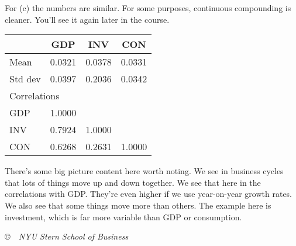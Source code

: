 \documentclass[12pt]{exam}
\begin{document}
\begin{questions}
\begin{solution}
For (c) the numbers are similar.
For some purposes, continuous compounding is cleaner.
You'll see it again later in the course.
%
\begin{center}
\begin{tabular}{lccc}
\toprule
            &   GDP   &  INV  &   CON  \\
\midrule
Mean        &  0.0321 &  0.0378 & 0.0331 \\
Std dev     &  0.0397 &  0.2036 & 0.0342 \\
\midrule
\multicolumn{2}{l}{Correlations} \\
GDP         &  1.0000 \\
INV         &  0.7924 & 1.0000 \\
CON         &  0.6268 & 0.2631 & 1.0000 \\
\bottomrule
\end{tabular}
\end{center}

There's some big picture content here worth noting.
We see in business cycles that lots of things move up and down together.
We see that here in the correlations with GDP.
They're even higher if we use year-on-year growth rates.
We also see that some things move more than others.
The example here is investment,
which is far more variable than GDP or consumption.


\end{solution}

\end{questions}


\vfill \centerline{\it \copyright \ \number\year \
NYU Stern School of Business}
\end{document}
